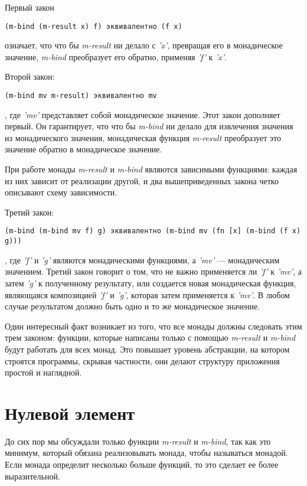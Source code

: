 \documentclass[a4paper,12pt]{article}
\newcommand{\cl}[1] {{\it #1}}
\begin{document}
Первый закон

\begin{verbatim}
(m-bind (m-result x) f) эквивалентно (f x)
\end{verbatim}
означает, что что бы \cl{m-result}  ни делало с \cl{'x'}, превращая его в монадическое значение,
\cl{m-bind} преобразует его обратно, применяя \cl{'f'} к \cl{'x'}.

Второй закон:

\begin{verbatim}
(m-bind mv m-result) эквивалентно mv
\end{verbatim}
, где \cl{'mv'} представляет собой монадическое значение. Этот закон дополняет первый. 
Он гарантирует, что что бы \cl{m-bind} ни делало для извлечения значения из монадического значения, 
монадическая функция \cl{m-result} преобразует это значение обратно в монадическое значение. 

При работе монады \cl{m-result} и \cl{m-bind} являются зависимыми функциями: каждая из них зависит 
от реализации другой, и два вышеприведенных закона четко описывают схему зависимости. 

Третий закон:

\begin{verbatim}
(m-bind (m-bind mv f) g) эквивалентно (m-bind mv (fn [x] (m-bind (f x) g)))
\end{verbatim}
, где \cl{'f'} и \cl{'g'} являются монадическими функциями, а \cl{'mv'} --- монадическим значением.
Третий закон говорит о том, что не важно применяется ли \cl{'f'} к \cl{'mv'}, а затем \cl{'g'} к полученному результату, или
создается новая монадическая функция, являющаяся композицией \cl{'f'} и \cl{'g'}, которая затем применяется к \cl{'mv'}.
В любом случае результатом должно быть одно и то же монадическое значение. 

Один интересный факт возникает из того, что все монады должны следовать этим трем законом: функции, которые
написаны только с помощью \cl{m-result} и \cl{m-bind} будут работать для всех монад. Это повышает уровень абстракции, на котором
строятся программы, скрывая частности, они делают структуру приложения простой и наглядной. 


\section{Нулевой элемент}\label{zeros}
До сих пор мы обсуждали только функции \cl{m-result} и \cl{m-bind}, так как это минимум, который обязана
реализовывать монада, чтобы называться монадой. Если монада определит несколько больше функций,
то это сделает ее более выразительной.
\end{document}
